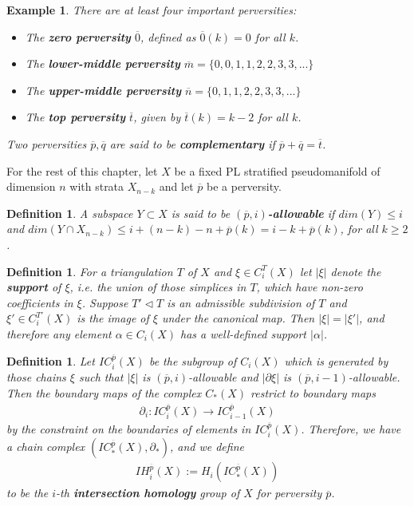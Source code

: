 \documentclass{scrreprt}
\newtheorem{definition}[prop]{Definition}
\newtheorem{example}[prop]{Example}
\begin{document}
\begin{example}
There are at least four important perversities:
\begin{itemize}
\item The \textbf{zero perversity} $\overline{0}$, defined as $\overline{0}(k)=0$ for all $k$.
\item The \textbf{lower-middle perversity} $\overline{m}= \{ 0,0,1,1,2,2,3,3,... \}$
\item The \textbf{upper-middle perversity} $\overline{n}= \{ 0,1,1,2,2,3,3,... \}$
\item The \textbf{top perversity} $\overline{t}$, given by $\overline{t}(k)=k-2$ for all $k$.
\end{itemize}
Two perversities $\overline{p}, \overline{q}$ are said to be \textbf{complementary} if $\overline{p}+ \overline{q}= \overline{t}$.
\end{example}


For the rest of this chapter, let $X$ be a fixed PL stratified pseudomanifold of dimension $n$ with strata $X_{n-k}$  and let $\overline{p}$ be a perversity.

\begin{definition}
A subspace $Y \subset X$ is said to be \textbf{$(\overline{p},i)$-allowable} if $dim(Y) \leq i$ and $dim(Y \cap X_{n-k}) \leq i+(n-k)-n+ \overline{p}(k)=i-k+\overline{p}(k)$, for all $k \geq 2$.
\end{definition}

\begin{definition}
For a triangulation $T$ of $X$ and $\xi \in C_i^T(X)$ let $|\xi|$ denote the \textbf{support} of $\xi$, i.e. the union of those simplices in $T$, which have non-zero coefficients in $\xi$. Suppose $T' \lhd T$ is an admissible subdivision of $T$ and $\xi' \in C_i^{T'}(X)$ is the image of $\xi$ under the canonical map. Then $|\xi|=|\xi'|$, and therefore any element $\alpha \in C_i(X)$ has a well-defined support $|\alpha|$.
\end{definition}

\begin{definition}
Let $IC_i^{\overline{p}}(X)$ be the subgroup of $C_i(X)$ which is generated by those chains $\xi$ such that $|\xi|$ is $(\overline{p},i)$-allowable and $|\partial \xi|$ is $(\overline{p},i-1)$-allowable. Then the boundary maps of the complex $C_*(X)$ restrict to boundary maps
\begin{align*}
\partial_i : IC_i^{\overline{p}}(X) \to IC_{i-1}^{\overline{p}}(X)
\end{align*}
by the constraint on the boundaries of elements in $IC_i^{\overline{p}}(X)$. Therefore, we have a chain complex $(IC_*^{\overline{p}}(X),\partial_*)$, and we define
\begin{align*}
IH_i^{\overline{p}}(X):=H_i(IC_*^{\overline{p}}(X))
\end{align*}
to be the $i$-th \textbf{intersection homology} group of $X$ for perversity $\overline{p}$.
\end{definition}
\end{document}
